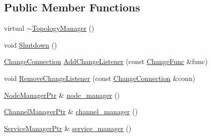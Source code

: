 \subsection*{Public Member Functions}
\begin{DoxyCompactItemize}
\item 
virtual \hyperlink{classapollo_1_1cyber_1_1service__discovery_1_1TopologyManager_a20db67d81617386524f5a64b1d678806}{$\sim$\-Topology\-Manager} ()
\item 
void \hyperlink{classapollo_1_1cyber_1_1service__discovery_1_1TopologyManager_a63f75445d72c3e01fc87429b0356ba6e}{Shutdown} ()
\item 
\hyperlink{classapollo_1_1cyber_1_1service__discovery_1_1TopologyManager_a9e207f3236b725d74eb37e5d27551ae6}{Change\-Connection} \hyperlink{classapollo_1_1cyber_1_1service__discovery_1_1TopologyManager_a2a223b8391a9b739040957c044dd9033}{Add\-Change\-Listener} (const \hyperlink{classapollo_1_1cyber_1_1service__discovery_1_1TopologyManager_a50328f9e6813bf53a9e974bb39f716f5}{Change\-Func} \&func)
\item 
void \hyperlink{classapollo_1_1cyber_1_1service__discovery_1_1TopologyManager_a20f4728bef31bd0894b6fee951c9580c}{Remove\-Change\-Listener} (const \hyperlink{classapollo_1_1cyber_1_1service__discovery_1_1TopologyManager_a9e207f3236b725d74eb37e5d27551ae6}{Change\-Connection} \&conn)
\item 
\hyperlink{namespaceapollo_1_1cyber_1_1service__discovery_a1e5adf7bd56b68299dae8d202f20bc81}{Node\-Manager\-Ptr} \& \hyperlink{classapollo_1_1cyber_1_1service__discovery_1_1TopologyManager_a94b6ab1c670e49315afeed6269c60714}{node\-\_\-manager} ()
\item 
\hyperlink{namespaceapollo_1_1cyber_1_1service__discovery_a12c2dfc39551ef96e3110dae235ab609}{Channel\-Manager\-Ptr} \& \hyperlink{classapollo_1_1cyber_1_1service__discovery_1_1TopologyManager_a7ca771e869399d565596c43d3f73ce6b}{channel\-\_\-manager} ()
\item 
\hyperlink{namespaceapollo_1_1cyber_1_1service__discovery_a257bddadfae4c3b6efbc25c6d63c28f9}{Service\-Manager\-Ptr} \& \hyperlink{classapollo_1_1cyber_1_1service__discovery_1_1TopologyManager_ac1d46063cd465d606b188884b4be2269}{service\-\_\-manager} ()
\end{DoxyCompactItemize}
